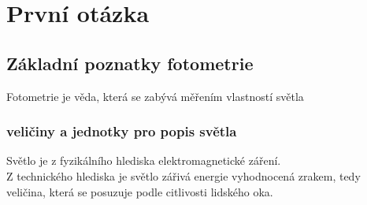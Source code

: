 \chapter{První otázka}
\section{Základní poznatky fotometrie}
Fotometrie je věda, která se zabývá měřením vlastností světla
\subsection{veličiny a jednotky pro popis světla}
Světlo je z fyzikálního hlediska elektromagnetické záření.\\
Z technického hlediska je světlo zářivá energie vyhodnocená zrakem, tedy veličina, která se posuzuje podle citlivosti lidského oka.
